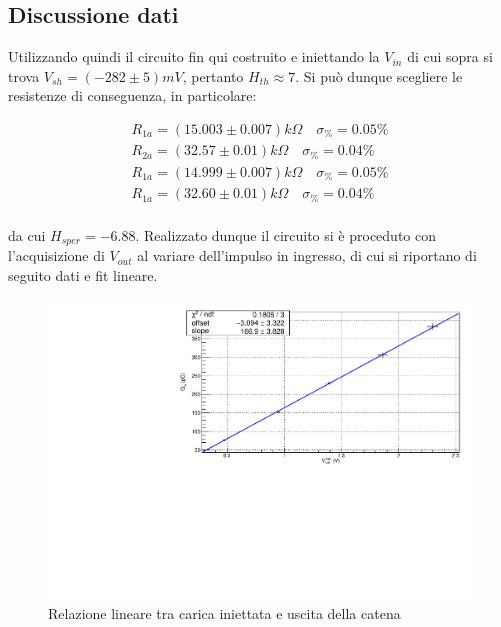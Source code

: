 \documentclass{article}
\begin{document}
\subsection{Discussione dati}

Utilizzando quindi il circuito fin qui costruito e iniettando la $V_{in}$ di cui sopra si trova $V_{sh} = (-282 \pm 5) mV$, pertanto
$H_{th} \approx 7$. Si può dunque scegliere le resistenze di conseguenza, in particolare:

\begin{align*}
    R_{1a} = (15.003 \pm 0.007) k\Omega \quad \sigma_{\%} = 0.05\% \\
    R_{2a} = (32.57 \pm 0.01) k\Omega \quad \sigma_{\%} = 0.04\% \\
    R_{1a} = (14.999 \pm 0.007) k\Omega \quad \sigma_{\%} = 0.05\% \\
    R_{1a} = (32.60 \pm 0.01) k\Omega \quad \sigma_{\%} = 0.04\% \\
\end{align*}

da cui $H_{sper}=-6.88$. Realizzato dunque il circuito si è proceduto con l'acquisizione di $V_{out}$ al variare dell'impulso in
ingresso, di cui si riportano di seguito dati e fit lineare.

\begin{center}
\begin{figure}[H]
\centering
\includegraphics[scale=0.4, angle=0]{fitcatena.pdf}
\caption{Relazione lineare tra carica iniettata e uscita della catena}
\label{fig:catenaQvsV}
\end{figure}
\end{center}
\end{document}
